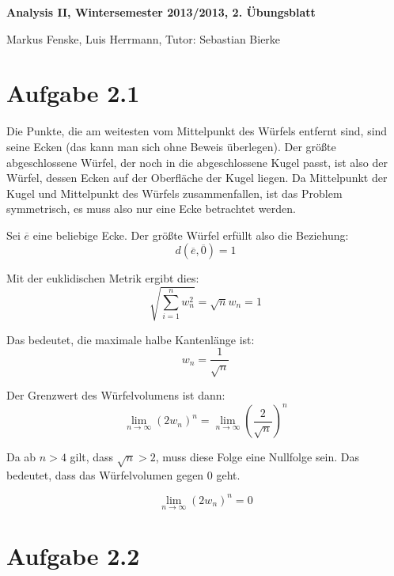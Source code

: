 \documentclass[a4paper,german,12pt,smallheadings]{scrartcl}
\begin{document}
\begin{center}
\bfseries %
\sffamily %
\vspace{-40pt}
Analysis II, Wintersemester 2013/2013, 2. Übungsblatt

Markus Fenske, Luis Herrmann, Tutor: Sebastian Bierke
\vspace{-10pt}
\end{center}

\section*{Aufgabe 2.1}
Die Punkte, die am weitesten vom Mittelpunkt des Würfels entfernt sind, sind
seine Ecken (das kann man sich ohne Beweis überlegen). Der größte
abgeschlossene Würfel, der noch in die abgeschlossene Kugel passt, ist also der
Würfel, dessen Ecken auf der Oberfläche der Kugel liegen. Da Mittelpunkt der
Kugel und Mittelpunkt des Würfels zusammenfallen, ist das Problem symmetrisch,
es muss also nur eine Ecke betrachtet werden.

Sei $\overline{e}$ eine beliebige Ecke. Der größte Würfel erfüllt also die Beziehung:
\begin{equation}
  d(\overline{e},\overline{0}) = 1
\end{equation}

Mit der euklidischen Metrik ergibt dies:
\begin{equation*}
  \sqrt{\sum_{i=1}^n w_n^2} = \sqrt{n} w_n = 1
\end{equation*}

Das bedeutet, die maximale halbe Kantenlänge ist:
\begin{equation*}
  w_n = \frac{1}{\sqrt{n}}
\end{equation*}

Der Grenzwert des Würfelvolumens ist dann:
\begin{equation*}
  \lim_{n \to \infty} (2w_n)^n = \lim_{n \to \infty} \left(\frac{2}{\sqrt{n}}\right)^n
\end{equation*}

Da ab $n > 4$ gilt, dass $\sqrt{n} > 2$, muss diese Folge eine
Nullfolge sein. Das bedeutet, dass das Würfelvolumen gegen 0 geht.

\begin{equation*}
  \lim_{n \to \infty} (2w_n)^n = 0
\end{equation*}

\section*{Aufgabe 2.2}
\end{document}
